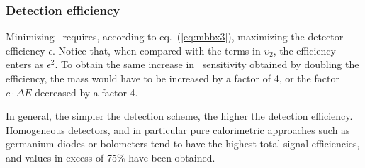
\subsubsection{Detection efficiency} 

Minimizing \mbb\ requires, according to eq.~(\ref{eq:mbbx3}), maximizing the detector efficiency $\epsilon$. Notice that, when compared with the terms in $\upsilon_2$, 
the efficiency enters as $\epsilon^2$. 
To obtain the same increase in \mbb\ sensitivity obtained by doubling the efficiency, the mass would have to be increased by a factor of 4, or the factor
$c\cdot \Delta E$ decreased by a factor 4. 

In general, the simpler the detection scheme, the higher the detection efficiency. Homogeneous detectors, 
and in particular 
pure calorimetric approaches such as germanium diodes or bolometers tend to have the highest total signal efficiencies, and values in excess of 75\% have been obtained. 
%

